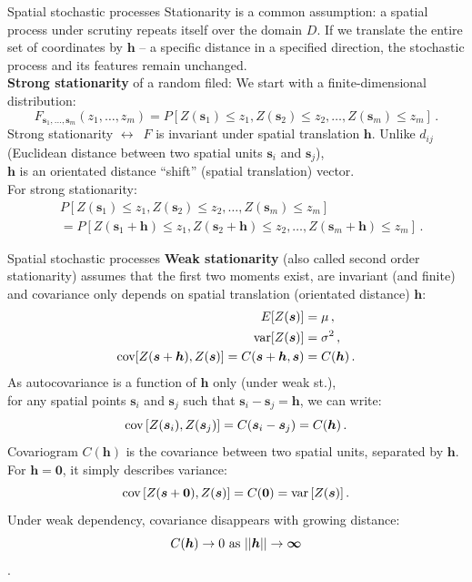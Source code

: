 \documentclass{beamer}
\begin{document}
\begin{frame}{Spatial stochastic processes}
Stationarity is a common assumption: a spatial process under scrutiny repeats itself over the domain $D$. If we translate the entire set of coordinates by $\bm{h}$ -- a specific distance in a specified direction, the stochastic process and its features remain unchanged.\\
\medskip
\textbf{Strong stationarity} of a random filed: We start with a finite-dimensional distribution: 
$$F_{\bm{s}_1, \dots,\bm{s}_m }(z_1,\dots, z_m) = P[Z(\bm{s}_1) \leq z_1, Z(\bm{s}_2) \leq z_2, \dots, Z(\bm{s}_m) \leq z_m] \, .$$  
Strong stationarity $\leftrightarrow$~$F$ is invariant under spatial translation $\bm{h}$. Unlike $d_{ij}$ (Euclidean distance between two spatial units $\bm{s}_i$ and $\bm{s}_j$), \\$\bm{h}$ is an orientated distance ``shift'' (spatial translation) vector. \\For strong stationarity:
\begin{equation*}
\begin{aligned}
& P \left[Z(\bm{s}_1) \leq z_1, Z(\bm{s}_2) \leq z_2, \dots, Z(\bm{s}_m) \leq z_m \right] \\
& = P \left[Z(\bm{s}_1+\bm{h}) \leq z_1, Z(\bm{s}_2+\bm{h}) \leq z_2, \dots, Z(\bm{s}_m+\bm{h}) \leq z_m \right] \, .
\end{aligned} 
\end{equation*}
\end{frame}
\begin{frame}{Spatial stochastic processes}
\vspace{-0.2cm}
\textbf{Weak  stationarity} (also called second order stationarity) assumes that the first two moments exist, are invariant (and finite) and covariance only depends on spatial translation (orientated distance) $\bm{h}$:
\begin{equation*}
\begin{aligned}  
E[Z(\bm{s})] &= \mu \,, \\
\textnormal{var}[Z(\bm{s})] & = \sigma^2 \,, \\
\textnormal{cov} [Z(\bm{s}+\bm{h}),Z(\bm{s})] = C(\bm{s}+\bm{h}, \bm{s}) & = C(\bm{h}) \,.
\end{aligned} 
\end{equation*}
As autocovariance is a function of $\bm{h}$ only (under weak st.), \\for any spatial points $\bm{s}_i$ and $\bm{s}_j$ such that $\bm{s}_i -\bm{s}_j = \bm{h}$, we can write: 
\begin{equation*}
\textnormal{cov} \left[ Z(\bm{s}_i), Z(\bm{s}_j) \right] = C(\bm{s}_i - \bm{s}_j) = C(\bm{h}) \,.  
\end{equation*}
Covariogram $C(\bm{h})$ is the covariance between two spatial units, separated by $\bm{h}$. For $\bm{h} = \bm{0}$, it simply describes variance: 
$$\textnormal{cov}\,[Z(\bm{s}+\bm{0}),Z(\bm{s})] =  C(\bm{0}) = \textnormal{var}\,[Z(\bm{s})]\,.$$
Under weak dependency, covariance disappears with growing distance: 
$$C(\bm{h}) \rightarrow 0~\textnormal{as}~||\bm{h}|| \rightarrow \bm{\infty}$$.
\end{frame}
\end{document}
